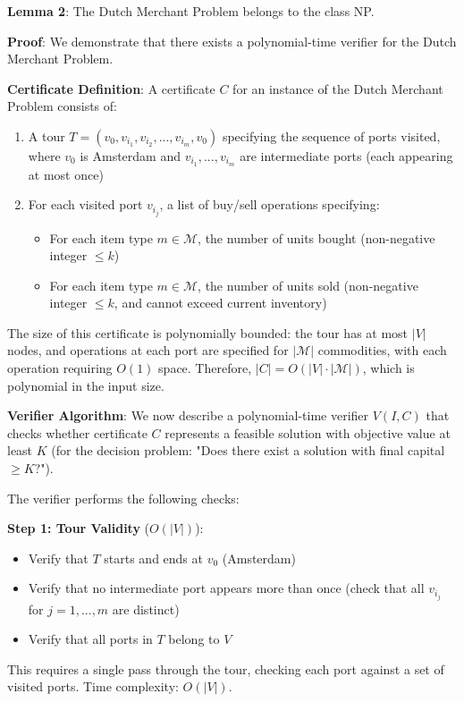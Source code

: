 \documentclass[12pt]{article}
\begin{document}
\textbf{Lemma 2}: The Dutch Merchant Problem belongs to the class NP.

\textbf{Proof}: We demonstrate that there exists a polynomial-time verifier for the Dutch Merchant Problem.

\textbf{Certificate Definition}: A certificate $C$ for an instance of the Dutch Merchant Problem consists of:
\begin{enumerate}
    \item A tour $T = (v_0, v_{i_1}, v_{i_2}, ..., v_{i_m}, v_0)$ specifying the sequence of ports visited, where $v_0$ is Amsterdam and $v_{i_1}, ..., v_{i_m}$ are intermediate ports (each appearing at most once)
    \item For each visited port $v_{i_j}$, a list of buy/sell operations specifying:
    \begin{itemize}
        \item For each item type $m \in \mathcal{M}$, the number of units bought (non-negative integer $\leq k$)
        \item For each item type $m \in \mathcal{M}$, the number of units sold (non-negative integer $\leq k$, and cannot exceed current inventory)
    \end{itemize}
\end{enumerate}

The size of this certificate is polynomially bounded: the tour has at most $|V|$ nodes, and operations at each port are specified for $|\mathcal{M}|$ commodities, with each operation requiring $O(1)$ space. Therefore, $|C| = O(|V| \cdot |\mathcal{M}|)$, which is polynomial in the input size.

\textbf{Verifier Algorithm}: We now describe a polynomial-time verifier $V(I, C)$ that checks whether certificate $C$ represents a feasible solution with objective value at least $K$ (for the decision problem: "Does there exist a solution with final capital $\geq K$?").

The verifier performs the following checks:

\textbf{Step 1: Tour Validity} ($O(|V|)$):
\begin{itemize}
    \item Verify that $T$ starts and ends at $v_0$ (Amsterdam)
    \item Verify that no intermediate port appears more than once (check that all $v_{i_j}$ for $j = 1, ..., m$ are distinct)
    \item Verify that all ports in $T$ belong to $V$
\end{itemize}
This requires a single pass through the tour, checking each port against a set of visited ports. Time complexity: $O(|V|)$.
\end{document}
